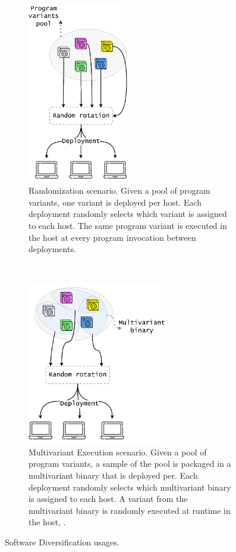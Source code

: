 \newcommand{\rulesep}{\unskip\ \vrule\ }
\begin{figure}[h]
    \centering
    \begin{subfigure}[t]{0.45\textwidth}
        \centering
        \includegraphics[height=3.1in]{diagrams/randomization.pdf}
        \vspace{0.5cm}
        \caption{Randomization scenario. Given a pool of program variants, one variant is deployed per host. Each deployment randomly selects which variant is assigned to each host. The same program variant is executed in the host at every program invocation between deployments. }        \label{diagrams:sota:randomization}

    \end{subfigure}
    \hspace{1.5mm}
    \rulesep
    \hspace{1.5mm}
    \begin{subfigure}[t]{0.45\textwidth}
        \centering
        \includegraphics[height=2.8in]{diagrams/mve.pdf}
        \caption{Multivariant Execution scenario. Given a pool of program variants, a sample of the pool is packaged in a multivariant binary that is deployed per. Each deployment randomly selects which multivariant binary is assigned to each host. A variant from the multivariant binary is randomly executed at runtime in the host, .}        \label{diagrams:sota:mve}

    \end{subfigure}
    \caption{Software Diversification usages. }
\end{figure}




